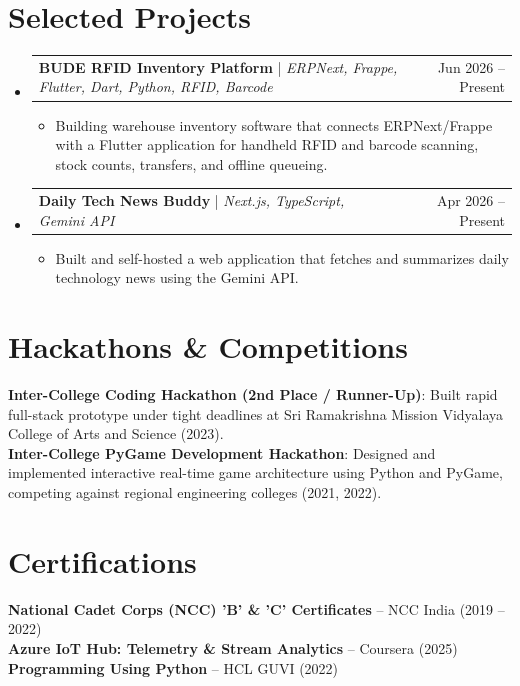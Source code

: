 \documentclass[letterpaper,10pt]{article}
\makeatletter
\newcommand{\resumeItem}[1]{
  \item\small{
    {#1 \vspace{-3pt}}
  }
}
\newcommand{\resumeProjectHeading}[2]{
    \item
    \begin{tabular*}{0.97\textwidth}{l@{\extracolsep{\fill}}r}
      \small#1 & #2 \\
    \end{tabular*}\vspace{-8pt}
}
\newcommand{\resumeSubHeadingListStart}{\begin{itemize}[leftmargin=0.15in, label={}, itemsep=0pt, topsep=1pt]}
\newcommand{\resumeSubHeadingListEnd}{\end{itemize}}
\newcommand{\resumeItemListStart}{\begin{itemize}[leftmargin=0.2in, itemsep=0pt, topsep=1pt]}
\newcommand{\resumeItemListEnd}{\end{itemize}\vspace{-6pt}}
\makeatother
\begin{document}
\section{Selected Projects}
    \resumeSubHeadingListStart
      \resumeProjectHeading
          {\textbf{BUDE RFID Inventory Platform} | \emph{ERPNext, Frappe, Flutter, Dart, Python, RFID, Barcode}}{Jun 2026 -- Present}
          \resumeItemListStart
            \resumeItem{Building warehouse inventory software that connects ERPNext/Frappe with a Flutter application for handheld RFID and barcode scanning, stock counts, transfers, and offline queueing.}
          \resumeItemListEnd
      \resumeProjectHeading
          {\textbf{Daily Tech News Buddy} | \emph{Next.js, TypeScript, Gemini API}}{Apr 2026 -- Present}
          \resumeItemListStart
            \resumeItem{Built and self-hosted a web application that fetches and summarizes daily technology news using the Gemini API.}
          \resumeItemListEnd
    \resumeSubHeadingListEnd


\section{Hackathons \& Competitions}
 \begin{itemize}[leftmargin=0.15in, label={}, itemsep=0pt, topsep=1pt]
    \small{\item{
     \textbf{Inter-College Coding Hackathon (2nd Place / Runner-Up)}{: Built rapid full-stack prototype under tight deadlines at Sri Ramakrishna Mission Vidyalaya College of Arts and Science (2023).} \\
     \textbf{Inter-College PyGame Development Hackathon}{: Designed and implemented interactive real-time game architecture using Python and PyGame, competing against regional engineering colleges (2021, 2022).}
    }}
 \end{itemize}


\section{Certifications}
 \begin{itemize}[leftmargin=0.15in, label={}, itemsep=0pt, topsep=1pt]
    \small{\item{
     \textbf{National Cadet Corps (NCC) 'B' \& 'C' Certificates} -- NCC India (2019 -- 2022) \\
     \textbf{Azure IoT Hub: Telemetry \& Stream Analytics} -- Coursera (2025) \\
     \textbf{Programming Using Python} -- HCL GUVI (2022)
    }}
 \end{itemize}

\end{document}

